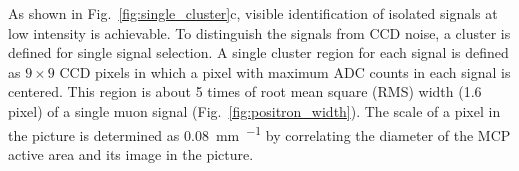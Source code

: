 \documentclass[preprint,3p,twocolumn]{elsarticle}
\begin{document}
As shown in Fig.~\ref{fig:single_cluster}c, visible identification of isolated signals at low intensity is achievable.
%
To distinguish the signals from
CCD noise, a cluster is defined for single signal selection. A
single cluster region for each signal is defined as $9 \times 9$
CCD pixels in which a pixel with maximum ADC counts in each signal is centered. This
region is about 5 times of root mean square (RMS) width (1.6
pixel) of a single muon signal (Fig.~\ref{fig:positron_width}). 
The scale of a pixel in the
picture is determined as \SI{0.08}{\mm \per \pixel} by correlating
the diameter of the MCP active area and its image in the picture.
%
\end{document}
